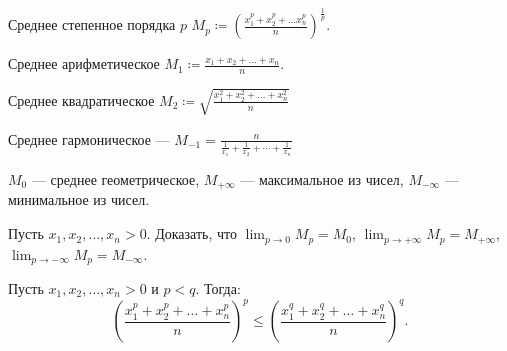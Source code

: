 \begin{definition}
    Среднее степенное порядка $p$  $M_p \coloneqq \left(\frac{x_1^p + x_2^p + \ldots x_n^p}{n}\right)^{\frac{1}{p}}$.
\end{definition}
\begin{definition}
    Среднее арифметическое $M_1 \coloneqq \frac{x_1 + x_2 + \ldots + x_n}{n}$.
\end{definition}
\begin{definition}
    Среднее квадратическое $M_2 \coloneqq \sqrt{\frac{x_1^2 + x_2^2 + \ldots + x_n^2}{n}}$
\end{definition}
\begin{definition}
	Среднее гармоническое --- $M_{-1} = \frac{n}{\frac1{x_1} + \frac1{x_2} + \cdots + \frac1{x_n}}$
\end{definition}
\begin{definition}[Доопределение]
    $M_0$ --- среднее геометрическое,  $M_{+\infty}$ --- максимальное из чисел,  $M_{-\infty}$ --- минимальное из чисел. 
\end{definition}
\begin{exerc}
    Пусть $x_1, x_2, \ldots, x_n > 0$. Доказать, что $\lim_{p \to 0} M_p = M_0$,  $\lim_{p \to +\infty} M_p = M_{+\infty}$,  $\lim_{p \to -\infty} M_p = M_{-\infty}$.
\end{exerc}
\begin{theorem}
    Пусть $x_1, x_2, \ldots, x_n > 0$ и $p < q$. Тогда:
     \[
         \left( \frac{x_1 ^ p + x_2^p + \ldots + x_n^p}{n} \right)^p \le \left( \frac{x_1 ^ q + x_2^q + \ldots + x_n^q}{n} \right)^q
    .\] 
\end{theorem}

